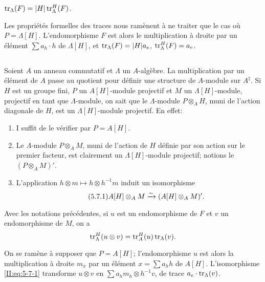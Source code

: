 \begin{proposition_}\label{II:5-6}
$\operatorname{tr}_\Lambda(F) = |H|\operatorname{tr}_\Lambda^H(F)$. 
\end{proposition_}

Les propriétés formelles des traces nous ramènent à ne traiter que le 
cas où $P=\Lambda[H]$. L'endomorphisme $F$ est alors le multiplication à 
droite par un élément $\sum a_h\cdot h$ de $\Lambda[H]$, et 
$\operatorname{tr}_\Lambda(F) = |H| a_e$, $\operatorname{tr}_\Lambda^H(F) = a_e$. 





\subsection{}\label{II:5-7}

Soient $A$ un anneau commutatif et $\Lambda$ un $A$-algèbre. La multiplication 
par un élément de $A$ passe au quotient pour définir une structure de 
$A$-module sur $A^\natural$. Si $H$ est un groupe fini, $P$ un $A[H]$-module 
projectif et $M$ un $\Lambda[H]$-module, projectif en tant que $\Lambda$-module, 
on sait que le $\Lambda$-module $P\otimes_A H$, muni de l'action diagonale de 
$H$, est un $\Lambda[H]$-module projectif. En effet: 
\begin{enumerate}[\indent a)]
  \item I suffit de le vérifier par $P=A[H]$. 
  \item Le $\Lambda$-module $P\otimes_A M$, muni de l'action de $H$ définie 
    par son action sur le premier facteur, est clairement un 
    $\Lambda[H]$-module projectif; notions le $(P\otimes_A M)'$. 
  \item L'application $h\otimes m\mapsto h\otimes h^{-1} m$ induit un 
    isomorphisme 
    \begin{equation*}\tag{5.7.1}\label{II:eq:5-7-1}
      A[H]\otimes_A M \xrightarrow\sim (A[H]\otimes_A M)' \text{.}
    \end{equation*}
\end{enumerate}





\begin{proposition_}\label{II:5-8}
Avec les notations précédentes, si $u$ est un endomorphisme de $F$ et 
$v$ un endomorphisme de $M$, on a 
\[
  \operatorname{tr}_\Lambda^H(u\otimes v) = \operatorname{tr}_A^H(u)\operatorname{tr}_\Lambda(v) \text{.}
\]
\end{proposition_}

On se ramène à supposer que $P=A[H]$; l'endomorphisme $u$ est alors la 
multiplication à droite $m_x$ par un élément $x=\sum a_h h$ de $A[H]$. 
L'isomorphisme \eqref{II:eq:5-7-1} transforme $u\otimes v$ en 
$\sum a_h m_h\otimes h^{-1} v$, de trace $a_e\cdot\operatorname{tr}_\Lambda(v)$. 





